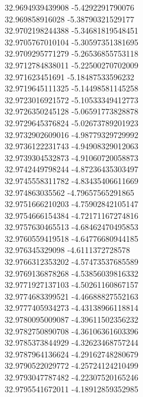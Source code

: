 {32.9694939439908	-5.4292291790076\\
32.969858916028	-5.38790321529177\\
32.9702198244388	-5.34681819548451\\
32.9705767010104	-5.30597351381695\\
32.9709295771279	-5.26536855753118\\
32.9712784838011	-5.22500270702009\\
32.971623451691	-5.18487533596232\\
32.9719645111325	-5.14498581145258\\
32.9723016921572	-5.10533349412773\\
32.9726350245128	-5.06591773828878\\
32.9729645376824	-5.02673789201923\\
32.9732902609016	-4.98779329729992\\
32.9736122231743	-4.94908329012063\\
32.9739304532873	-4.91060720058873\\
32.9742449798244	-4.87236435303497\\
32.9745558311782	-4.83435406611669\\
32.974863035562	-4.79657565291865\\
32.9751666210203	-4.75902842105147\\
32.9754666154384	-4.72171167274816\\
32.9757630465513	-4.68462470495853\\
32.9760559419518	-4.64776680944185\\
32.976345329098	-4.6111372728578\\
32.9766312353202	-4.57473537685589\\
32.9769136878268	-4.53856039816332\\
32.9771927137103	-4.50261160867157\\
32.9774683399521	-4.46688827552163\\
32.9777405934273	-4.43138966118814\\
32.9780095009087	-4.39611502356232\\
32.9782750890708	-4.36106361603396\\
32.9785373844929	-4.32623468757244\\
32.9787964136624	-4.29162748280679\\
32.9790522029772	-4.25724124210499\\
32.9793047787482	-4.22307520165246\\
32.9795541672011	-4.18912859352985\\
}
